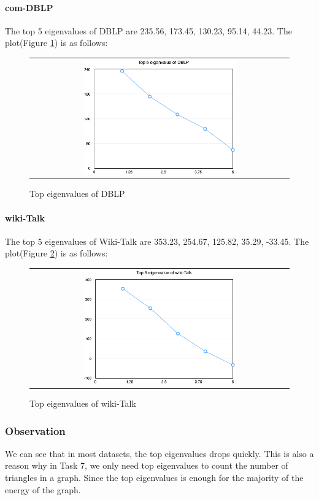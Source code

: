 \paragraph{com-DBLP}
The top 5 eigenvalues of DBLP are 235.56, 173.45, 130.23, 95.14, 44.23. The plot(Figure \ref{t5:dblp}) is as follows:
\begin{figure}[!htbf]
\begin{center}
\begin{tabular}{c}
     \includegraphics[width=0.6\textwidth]{FIG/t5_dblp.png}\\
\end{tabular}
\caption{Top eigenvalues of DBLP}
\label{t5:dblp}
\end{center}
\end{figure}

\paragraph{wiki-Talk}
The top 5 eigenvalues of Wiki-Talk are 353.23, 254.67, 125.82, 35.29, -33.45. The plot(Figure \ref{t5:wikitalk}) is as follows: 
\begin{figure}[!htbf]
\begin{center}
\begin{tabular}{c}
     \includegraphics[width=0.6\textwidth]{FIG/t5_wikitalk.png}\\
\end{tabular}
\caption{Top eigenvalues of wiki-Talk}
\label{t5:wikitalk}
\end{center}
\end{figure}

\subsubsection{Observation}
We can see that in most datasets, the top eigenvalues drops quickly. This is also a reason why in Task 7, we only need top eigenvalues to count the number of triangles in a graph. Since the top eigenvalues is enough for the majority of the energy of the graph.

